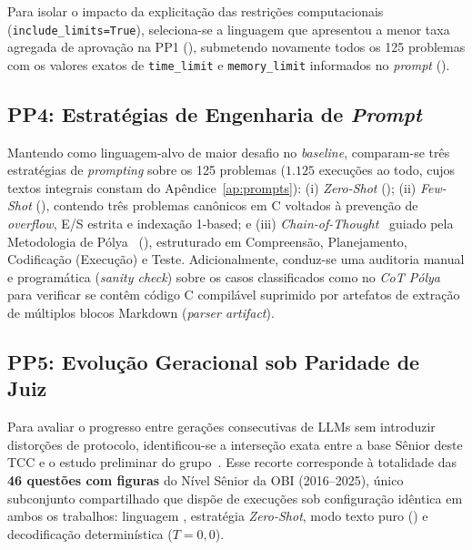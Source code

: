 Para isolar o impacto da explicitação das restrições computacionais (\texttt{include\_limits=True}), seleciona-se a linguagem que apresentou a menor taxa agregada de aprovação na PP1 (), submetendo novamente todos os 125 problemas com os valores exatos de \texttt{time\_limit} e \texttt{memory\_limit} informados no \textit{prompt} ().

\subsection{PP4: Estratégias de Engenharia de \texorpdfstring{\textit{Prompt}}{Prompt}}\label{sec:met-rq4}

Mantendo  como linguagem-alvo de maior desafio no \textit{baseline}, comparam-se três estratégias de \textit{prompting} sobre os 125 problemas ($1.125$ execuções ao todo, cujos textos integrais constam do Apêndice~\ref{ap:prompts}): (i) \textit{Zero-Shot} (); (ii) \textit{Few-Shot} (), contendo três problemas canônicos em C voltados à prevenção de \textit{overflow}, E/S estrita e indexação 1-based; e (iii) \textit{Chain-of-Thought}~\citep{wei2022chain} guiado pela Metodologia de Pólya~\citep{polya1945} (), estruturado em Compreensão, Planejamento, Codificação (Execução) e Teste. Adicionalmente, conduz-se uma auditoria manual e programática (\textit{sanity check}) sobre os casos classificados como  no \textit{CoT Pólya} para verificar se contêm código C compilável suprimido por artefatos de extração de múltiplos blocos Markdown (\textit{parser artifact}).

\subsection{PP5: Evolução Geracional sob Paridade de Juiz}\label{sec:met-rq5}

Para avaliar o progresso entre gerações consecutivas de LLMs sem introduzir distorções de protocolo, identificou-se a interseção exata entre a base Sênior deste TCC e o estudo preliminar do grupo~\citep{angelo2026ise,obibenchmarking2026}. Esse recorte corresponde à totalidade das \textbf{46 questões com figuras} do Nível Sênior da OBI (2016--2025), único subconjunto compartilhado que dispõe de execuções sob configuração idêntica em ambos os trabalhos: linguagem , estratégia \textit{Zero-Shot}, modo texto puro () e decodificação determinística ($T = 0{,}0$).

